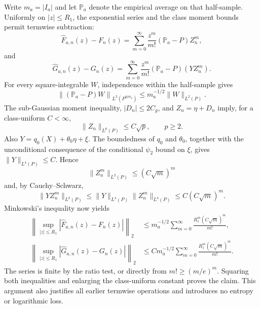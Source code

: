 Write \(m_a=|I_a|\) and let \(\mathbb P_a\) denote the empirical average on that half-sample.  Uniformly on \(|z|\le R_1\), the exponential series and the class moment bounds permit termwise subtraction:
\[
 \widehat F_{a,n}(z)-F_n(z)
 =\sum_{m=0}^{\infty}\frac{z^m}{m!}(\mathbb P_a-P)Z_n^m,
\]
and
\[
 \widehat G_{a,n}(z)-G_n(z)
 =\sum_{m=0}^{\infty}\frac{z^m}{m!}(\mathbb P_a-P)(YZ_n^m).
\]
For every square-integrable \(W\), independence within the half-sample gives
\[
 \left\|(\mathbb P_a-P)W\right\|_{L^2(P^{\otimes m_a})}
 \le m_a^{-1/2}\|W\|_{L^2(P)}.
\]
The sub-Gaussian moment inequality, \(|D_n|\le2C_g\), and \(Z_n=\eta+D_n\) imply, for a class-uniform \(C<\infty\),
\[
 \|Z_n\|_{L^p(P)}\le C\sqrt p,
 \qquad p\ge2.
\]
Also \(Y=q_0(X)+\theta_0\eta+\xi\).  The boundedness of \(q_0\) and \(\theta_0\), together with the unconditional consequence of the conditional \(\psi_2\) bound on \(\xi\), gives \(\|Y\|_{L^4(P)}\le C\).  Hence
\[
 \|Z_n^m\|_{L^2(P)}\le(C\sqrt m)^m
\]
and, by Cauchy--Schwarz,
\[
 \|YZ_n^m\|_{L^2(P)}
 \le\|Y\|_{L^4(P)}\|Z_n^m\|_{L^4(P)}
 \le C(C\sqrt m)^m.
\]
Minkowski's inequality now yields
\[
 \begin{aligned}
 \left\|\sup_{|z|\le R_1}|\widehat F_{a,n}(z)-F_n(z)|\right\|_2
 &\le m_a^{-1/2}\sum_{m=0}^{\infty}
   \frac{R_1^m(C\sqrt m)^m}{m!},\\
 \left\|\sup_{|z|\le R_1}|\widehat G_{a,n}(z)-G_n(z)|\right\|_2
 &\le Cm_a^{-1/2}\sum_{m=0}^{\infty}
   \frac{R_1^m(C\sqrt m)^m}{m!}.
 \end{aligned}
\]
The series is finite by the ratio test, or directly from \(m!\ge(m/e)^m\).  Squaring both inequalities and enlarging the class-uniform constant proves the claim.  This argument also justifies all earlier termwise operations and introduces no entropy or logarithmic loss.